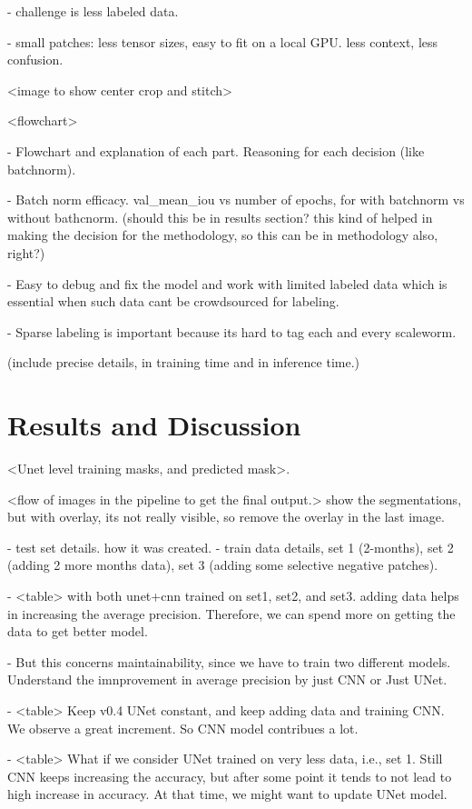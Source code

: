 \documentclass[10pt,twocolumn,letterpaper]{article}
\begin{document}
- challenge is less labeled data.

- small patches: less tensor sizes, easy to fit on a local GPU. less context, less confusion.

<image to show center crop and stitch>

<flowchart>

- Flowchart and explanation of each part. Reasoning for each decision (like batchnorm).

- Batch norm efficacy. val_mean_iou vs number of epochs, for with batchnorm vs without bathcnorm. (should this be in results section? this kind of helped in making the decision for the methodology, so this can be in methodology also, right?)

- Easy to debug and fix the model and work with limited labeled data which is essential when such data cant be crowdsourced for labeling.

- Sparse labeling is important because its hard to tag each and every scaleworm.

(include precise details, in training time and in inference time.)

\section{Results and Discussion}

<Unet level training masks, and predicted mask>.

<flow of images in the pipeline to get the final output.> show the segmentations, but with overlay, its not really visible, so remove the overlay in the last image.

- test set details. how it was created.
- train data details, set 1 (2-months), set 2 (adding 2 more months data), set 3 (adding some selective negative patches).

- <table> with both unet+cnn trained on set1, set2, and set3. adding data helps in increasing the average precision. Therefore, we can spend more on getting the data to get better model.

- But this concerns maintainability, since we have to train two different models. Understand the imnprovement in average precision by just CNN or Just UNet. 

- <table> Keep v0.4 UNet constant, and keep adding data and training CNN. We observe a great increment. So CNN model contribues a lot.

- <table> What if we consider UNet trained on very less data, i.e., set 1. Still CNN keeps increasing the accuracy, but after some point it tends to not lead to high increase in accuracy. At that time, we might want to update UNet model.
\end{document}
